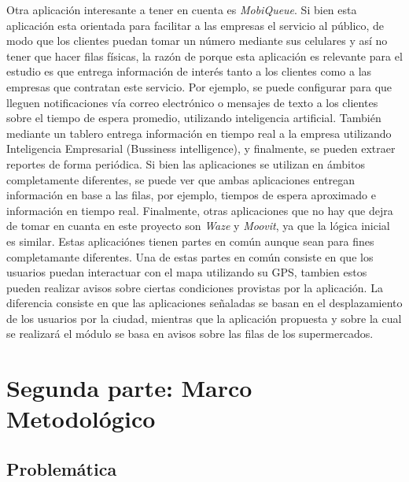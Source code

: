 Otra aplicación interesante a tener en cuenta es \textit{MobiQueue}. Si bien esta aplicación esta orientada para facilitar a las empresas el servicio al público, de modo que los clientes puedan tomar un número mediante sus celulares y así no tener que hacer filas físicas, la razón de porque esta aplicación es relevante para el estudio es que entrega información de interés tanto a los clientes como a las empresas que contratan este servicio. Por ejemplo, se puede configurar para que lleguen notificaciones vía correo electrónico o mensajes de texto a los clientes sobre el tiempo de espera promedio, utilizando inteligencia artificial. También mediante un tablero entrega información en tiempo real a la empresa utilizando Inteligencia Empresarial (Bussiness intelligence), y finalmente, se pueden extraer reportes de forma periódica. Si bien las aplicaciones se utilizan en ámbitos completamente diferentes, se puede ver que ambas aplicaciones entregan información en base a las filas, por ejemplo, tiempos de espera aproximado e información en tiempo real. %
\newline \newline
Finalmente, otras aplicaciones que no hay que dejra de tomar en cuanta en este proyecto son \textit{Waze} y \textit{Moovit}, ya que la lógica inicial es similar. Estas aplicaciónes tienen partes en común aunque sean para fines completamante diferentes. Una de estas partes en común consiste en que los usuarios puedan interactuar con el mapa utilizando su GPS, tambien estos pueden realizar avisos sobre ciertas condiciones provistas por la aplicación. La diferencia consiste en que las aplicaciones señaladas se basan en el desplazamiento de los usuarios por la ciudad, mientras que la aplicación propuesta y sobre la cual se realizará el módulo se basa en avisos sobre las filas de los supermercados. 
 
 


\section{Segunda parte: Marco Metodológico}
\label{sec:segunda}

\subsection{Problemática}
